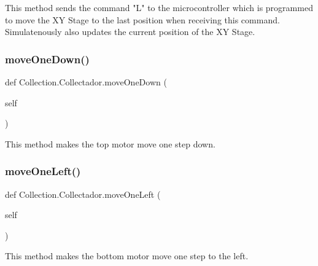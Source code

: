 \begin{DoxyVerb}This method sends the command "L" to the microcontroller which is programmed to move the XY Stage to the last position when receiving this command.
Simulatenously also updates the current position of the XY Stage.
\end{DoxyVerb}
 \mbox{\label{class_collection_1_1_collectador_a2a68201ca55e22ec63e306da0aaeec39}} 
\subsubsection{\texorpdfstring{moveOneDown()}{moveOneDown()}}
{\footnotesize\ttfamily def Collection.\+Collectador.\+move\+One\+Down (\begin{DoxyParamCaption}\item[{}]{self }\end{DoxyParamCaption})}

\begin{DoxyVerb}This method makes the top motor move one step down.
\end{DoxyVerb}
 \mbox{\label{class_collection_1_1_collectador_a129fbb777f2556972e92f4858b44fb16}} 
\subsubsection{\texorpdfstring{moveOneLeft()}{moveOneLeft()}}
{\footnotesize\ttfamily def Collection.\+Collectador.\+move\+One\+Left (\begin{DoxyParamCaption}\item[{}]{self }\end{DoxyParamCaption})}

\begin{DoxyVerb}This method makes the bottom motor move one step to the left.
\end{DoxyVerb}
 \mbox{\label{class_collection_1_1_collectador_a14b9821e1685764187122c92b6079adb}} 
